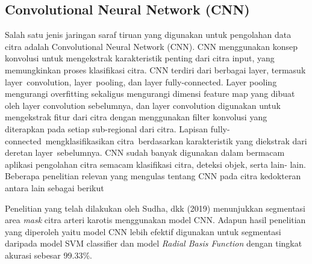 %
 
\subsection{Convolutional Neural Network (CNN)}
Salah satu jenis jaringan saraf tiruan yang digunakan untuk pengolahan data citra adalah Convolutional Neural Network (CNN). CNN menggunakan konsep konvolusi untuk mengekstrak karakteristik penting dari citra input, yang memungkinkan proses klasifikasi citra. CNN terdiri dari berbagai layer, termasuk layer convolution, layer pooling, dan layer fully-connected\cite{Mayank2020}. Layer pooling mengurangi overfitting sekaligus mengurangi dimensi feature map yang dibuat oleh layer convolution sebelumnya, dan layer convolution digunakan untuk mengekstrak fitur dari citra dengan menggunakan filter konvolusi yang diterapkan pada setiap sub-regional dari citra. Lapisan fully-connected mengklasifikasikan citra berdasarkan karakteristik yang diekstrak dari deretan layer sebelumnya.
CNN sudah banyak digunakan dalam bermacam aplikasi pengolahan citra semacam klasifikasi citra, deteksi objek, serta lain- lain. Beberapa penelitian relevan yang mengulas tentang CNN pada citra kedokteran antara lain sebagai berikut

Penelitian yang telah dilakukan oleh Sudha, dkk (2019)\cite{sudha2019} menunjukkan segmentasi area \textit{mask} citra arteri karotis menggunakan model CNN. Adapun hasil penelitian yang diperoleh yaitu model CNN lebih efektif digunakan untuk segmentasi daripada model SVM classifier dan model \textit{Radial Basis Function} dengan tingkat akurasi sebesar 99.33\%.


